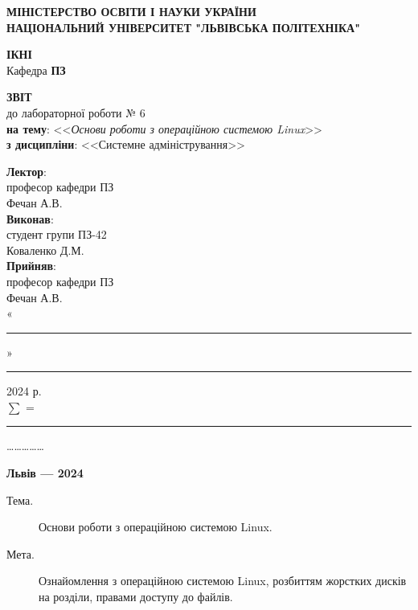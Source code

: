\documentclass[oneside,14pt]{extarticle}
\newcommand\subject{Системне адміністрування}
\newcommand\lecturer{професор кафедри ПЗ\\Фечан А.В.}
\newcommand\teacher{професор кафедри ПЗ\\Фечан А.В.}
\newcommand\mygroup{ПЗ-42}
\newcommand\lab{6}
\newcommand\theme{Основи роботи з операційною системою Linux}
\newcommand\purpose{Ознайомлення з операційною системою Linux, розбиттям
	жорстких дисків на розділи, правами доступу до файлів}
\begin{document}
\begin{normalsize}
	\begin{titlepage}
		\thispagestyle{empty}
		\begin{center}
			\textbf{МІНІСТЕРСТВО ОСВІТИ І НАУКИ УКРАЇНИ\\
				НАЦІОНАЛЬНИЙ УНІВЕРСИТЕТ "ЛЬВІВСЬКА ПОЛІТЕХНІКА"}
		\end{center}
		\begin{flushright}
			\textbf{ІКНІ}\\
			Кафедра \textbf{ПЗ}
		\end{flushright}
		\vspace{80pt}
		\begin{center}
			\textbf{ЗВІТ}\\
			\vspace{10pt}
			до лабораторної роботи № \lab\\
			\textbf{на тему}: <<\textit{\theme}>>\\
			\textbf{з дисципліни}: <<\subject>>
		\end{center}
		\vspace{80pt}
		\begin{flushright}
			
			\textbf{Лектор}:\\
			\lecturer\\
			\vspace{28pt}
			\textbf{Виконав}:\\
			
			студент групи \mygroup\\
			Коваленко Д.М.\\
			\vspace{28pt}
			\textbf{Прийняв}:\\
			
			\teacher\\
			
			\vspace{28pt}
			«\rule{1cm}{0.15mm}» \rule{1.5cm}{0.15mm} 2024 р.\\
			$\sum$ = \rule{1cm}{0.15mm}……………\\
			
		\end{flushright}
		\vspace{\fill}
		\begin{center}
			\textbf{Львів — 2024}
		\end{center}
	\end{titlepage}
		
	\begin{description}
		\item[Тема.] \theme.
		\item[Мета.] \purpose.
	\end{description}


\end{normalsize}
\end{document}
